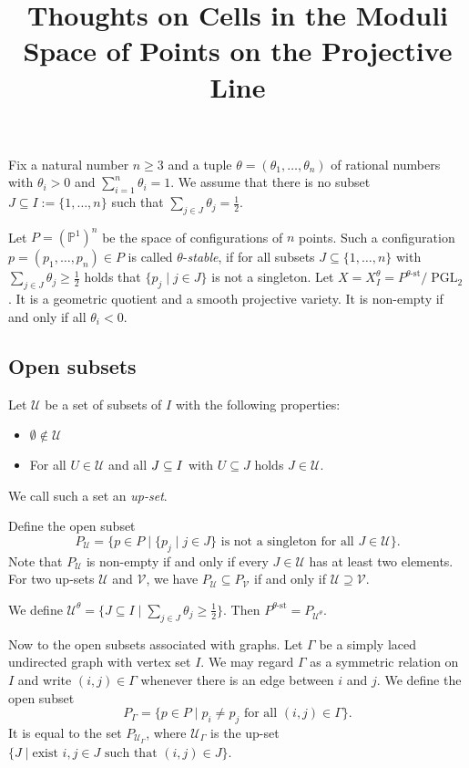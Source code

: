 \documentclass[11pt, a4paper]{amsart}
\title{Thoughts on Cells in the Moduli Space of Points on the Projective Line}
\author{}
\date{}
\begin{document}
	\maketitle
	
	Fix a natural number \(n \geq 3\) and a tuple \(\theta = (\theta_1,\ldots,\theta_n)\) of rational numbers with \(\theta_i > 0\) and \(\sum_{i=1}^n \theta_i = 1\). 
	We assume that there is no subset \(J \subseteq I := \{1,\ldots,n\}\) such that \(\sum_{j \in J} \theta_j = \frac{1}{2}\).

	Let \(P = {(\mathbb{P}^1)}^n\) be the space of configurations of \(n\) points. 
	Such a configuration \(p = (p_1,\ldots,p_n) \in P\) is called \(\theta\)-\emph{stable}, if for all subsets \(J \subseteq \{1,\ldots,n\}\) with \(\sum_{j \in J} \theta_j \geq \frac{1}{2}\) holds that \(\{p_j \mid j \in J\}\) is not a singleton.
	Let \(X = X_I^\theta = P^{\theta\text{-st}}/\operatorname{PGL}_2\). It is a geometric quotient and a smooth projective variety. 
	It is non-empty if and only if all \(\theta_i < 0\).

	\subsection*{Open subsets}
	Let \(\mathcal{U}\) be a set of subsets of \(I\) with the following properties:
	\begin{itemize}
		\item \(\emptyset \notin \mathcal{U}\)
		\item For all \(U \in \mathcal{U}\) and all \(J \subseteq I\) with \(U \subseteq J\) holds \(J \in \mathcal{U}\).
	\end{itemize}
	We call such a set an \emph{up-set}.

	Define the open subset 
	\[ 
		P_\mathcal{U} = \{p \in P \mid \{p_j \mid j \in J\} \text{ is not a singleton for all } J \in \mathcal{U} \}.
	\]
	Note that \(P_{\mathcal{U}}\) is non-empty if and only if every \(J \in \mathcal{U}\) has at least two elements. 
	For two up-sets \(\mathcal{U}\) and \(\mathcal{V}\), we have \(P_{\mathcal{U}} \subseteq P_{\mathcal{V}}\) if and only if \(\mathcal{U} \supseteq \mathcal{V}\).

	We define \(\mathcal{U}^\theta = \{J \subseteq I \mid \sum_{j \in J} \theta_j \geq \frac{1}{2} \}\). Then \(P^{\theta\text{-st}} = P_{\mathcal{U}^\theta}\).

	Now to the open subsets associated with graphs. Let \(\Gamma\) be a simply laced undirected graph with vertex set \(I\). 
	We may regard \(\Gamma\) as a symmetric relation on \(I\) and write \((i,j) \in \Gamma\) whenever there is an edge between \(i\) and \(j\). We define the open subset 
	\[
		P_\Gamma = \{p \in P \mid p_i \neq p_j \text{ for all } (i,j) \in \Gamma \}.
	\]
	It is equal to the set \(P_{\mathcal{U}_\Gamma}\), where \(\mathcal{U}_\Gamma\) is the up-set \(\{J \mid \text{exist } i,j \in J \text{ such that } (i,j) \in J\}\).
\end{document}

